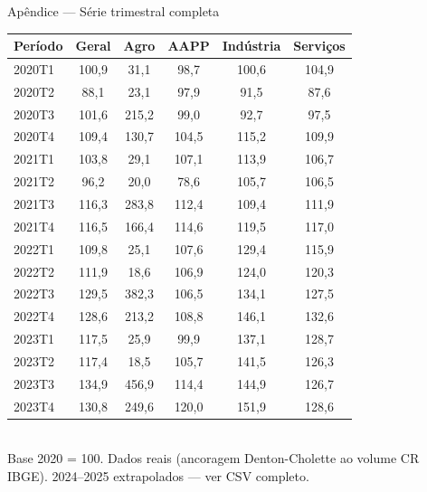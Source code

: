 \documentclass[aspectratio=169, 11pt]{beamer}
\begin{document}
\begin{frame}{Apêndice — Série trimestral completa}
  \small
  \renewcommand{\arraystretch}{1.1}
  \begin{tabular}{lccccc}
    \toprule
    \textbf{Período} & \textbf{Geral} & \textbf{Agro} & \textbf{AAPP} & \textbf{Indústria} & \textbf{Serviços} \\
    \midrule
    2020T1 & 100,9 &  31,1 &  98,7 & 100,6 & 104,9 \\
    2020T2 &  88,1 &  23,1 &  97,9 &  91,5 &  87,6 \\
    2020T3 & 101,6 & 215,2 &  99,0 &  92,7 &  97,5 \\
    2020T4 & 109,4 & 130,7 & 104,5 & 115,2 & 109,9 \\
    \hline
    2021T1 & 103,8 &  29,1 & 107,1 & 113,9 & 106,7 \\
    2021T2 &  96,2 &  20,0 &  78,6 & 105,7 & 106,5 \\
    2021T3 & 116,3 & 283,8 & 112,4 & 109,4 & 111,9 \\
    2021T4 & 116,5 & 166,4 & 114,6 & 119,5 & 117,0 \\
    \hline
    2022T1 & 109,8 &  25,1 & 107,6 & 129,4 & 115,9 \\
    2022T2 & 111,9 &  18,6 & 106,9 & 124,0 & 120,3 \\
    2022T3 & 129,5 & 382,3 & 106,5 & 134,1 & 127,5 \\
    2022T4 & 128,6 & 213,2 & 108,8 & 146,1 & 132,6 \\
    \hline
    2023T1 & 117,5 &  25,9 &  99,9 & 137,1 & 128,7 \\
    2023T2 & 117,4 &  18,5 & 105,7 & 141,5 & 126,3 \\
    2023T3 & 134,9 & 456,9 & 114,4 & 144,9 & 126,7 \\
    2023T4 & 130,8 & 249,6 & 120,0 & 151,9 & 128,6 \\
    \bottomrule
  \end{tabular}\\[4pt]
  {\tiny Base 2020 = 100. Dados reais (ancoragem Denton-Cholette ao volume CR IBGE). 2024--2025 extrapolados — ver CSV completo.}
\end{frame}
\end{document}
